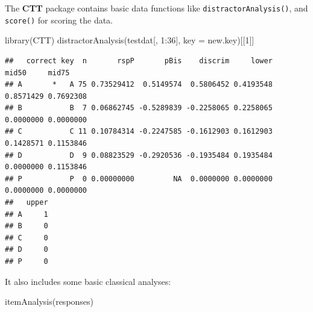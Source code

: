 \documentclass[
]{book}
\newenvironment{Shaded}{\begin{snugshade}}{\end{snugshade}}
\newcommand{\AttributeTok}[1]{\textcolor[rgb]{0.77,0.63,0.00}{#1}}
\newcommand{\CommentTok}[1]{\textcolor[rgb]{0.56,0.35,0.01}{\textit{#1}}}
\newcommand{\ConstantTok}[1]{\textcolor[rgb]{0.00,0.00,0.00}{#1}}
\newcommand{\DecValTok}[1]{\textcolor[rgb]{0.00,0.00,0.81}{#1}}
\newcommand{\FunctionTok}[1]{\textcolor[rgb]{0.00,0.00,0.00}{#1}}
\newcommand{\NormalTok}[1]{#1}
\newcommand{\OtherTok}[1]{\textcolor[rgb]{0.56,0.35,0.01}{#1}}
\newcommand{\SpecialCharTok}[1]{\textcolor[rgb]{0.00,0.00,0.00}{#1}}
\begin{document}
The \textbf{CTT} package contains basic data functions like \texttt{distractorAnalysis()}, and \texttt{score()} for scoring the data.

\begin{Shaded}
\begin{Highlighting}[]
\FunctionTok{library}\NormalTok{(CTT)}
\FunctionTok{distractorAnalysis}\NormalTok{(testdat[, }\DecValTok{1}\SpecialCharTok{:}\DecValTok{36}\NormalTok{], }\AttributeTok{key =}\NormalTok{ new.key)[[}\DecValTok{1}\NormalTok{]]}
\end{Highlighting}
\end{Shaded}

\begin{verbatim}
##   correct key  n       rspP       pBis    discrim     lower     mid50     mid75
## A       *   A 75 0.73529412  0.5149574  0.5806452 0.4193548 0.8571429 0.7692308
## B           B  7 0.06862745 -0.5289839 -0.2258065 0.2258065 0.0000000 0.0000000
## C           C 11 0.10784314 -0.2247585 -0.1612903 0.1612903 0.1428571 0.1153846
## D           D  9 0.08823529 -0.2920536 -0.1935484 0.1935484 0.0000000 0.1153846
## P           P  0 0.00000000         NA  0.0000000 0.0000000 0.0000000 0.0000000
##   upper
## A     1
## B     0
## C     0
## D     0
## P     0
\end{verbatim}

\begin{Shaded}
\end{Shaded}

It also includes some basic classical analyses:

\begin{Shaded}
\begin{Highlighting}[]
\FunctionTok{itemAnalysis}\NormalTok{(responses)}
\end{Highlighting}
\end{Shaded}
\end{document}
